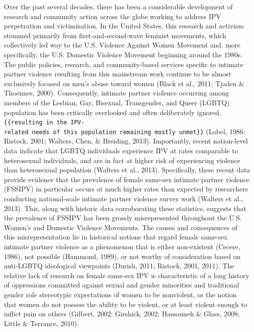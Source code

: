 \documentclass[11pt,]{tufte-book}
\begin{document}
Over the past several decades, there has been a considerable development
of research and community action across the globe working to address IPV
perpetration and victimization. In the United States, this research and
activism stemmed primarily from first-and-second-wave feminist
movements, which collectively led way to the U.S. Violence Against Women
Movement and, more specifically, the U.S. Domestic Violence Movement
beginning around the 1980s. The public policies, research, and
community-based services specific to intimate partner violence resulting
from this mainstream work continue to be almost exclusively focused on
men's abuse toward women (Black et al., 2011; Tjaden \& Thoennes, 2000).
Consequently, intimate partner violence occurring among members of the
Lesbian, Gay, Bisexual, Transgender, and Queer (LGBTQ) population has
been critically overlooked and often deliberately ignored,
\texttt{\{\{resulting\ in\ the\ IPV-related\ needs\ of\ this\ population\ remaining\ mostly\ unmet\}\}}
(Lobel, 1986; Ristock, 2001; Walters, Chen, \& Breiding, 2013).
Importantly, recent nation-level data indicate that LGBTQ individuals
experience IPV at rates comparable to heterosexual individuals, and are
in fact at higher risk of experiencing violence than heterosexual
population (Walters et al., 2013). Specifically, these recent data
provide evidence that the prevalence of female same-sex intimate partner
violence (FSSIPV) in particular occurs at much higher rates than
expected by researchers conducting national-scale intimate partner
violence survey work (Walters et al., 2013). This, along with historic
data corroborating these statistics, suggests that the prevalence of
FSSIPV has been grossly misrepresented throughout the U.S. Women's and
Domestic Violence Movements. The causes and consequences of this
misrepresentation lie in historical notions that regard female same-sex
intimate partner violence as a phenomenon that is either non-existent
(Cecere, 1986), not possible (Hammond, 1989), or not worthy of
consideration based on anti-LGBTQ ideological viewpoints (Durish, 2011;
Ristock, 2001, 2011). The relative lack of research on female same-sex
IPV is characteristic of a long history of oppressions committed against
sexual and gender minorities and traditional gender role stereotypic
expectations of women to be nonviolent, or the notion that women do not
possess the ability to be violent, or at least violent enough to inflict
pain on others (Gilbert, 2002; Girshick, 2002; Hassouneh \& Glass, 2008;
Little \& Terrance, 2010).
\end{document}

